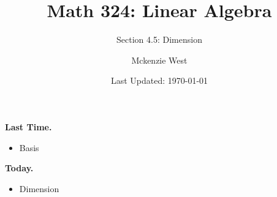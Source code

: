 \documentclass{beamer}
\theoremstyle{definition}
\begin{document}
	\title{Math 324: Linear Algebra}
	\subtitle{Section 4.5: Dimension}
	\author{Mckenzie West}
	\date{Last Updated: \today}
\begin{frame}
\maketitle
\end{frame}

\begin{frame}{\insertframenumber}
	\begin{block}{\textbf{Last Time.}}
	\begin{itemize}[label=--]
		\item Basis
	\end{itemize}
	\end{block}
	\begin{block}{\textbf{Today.}}
		\begin{itemize}[label=--]
			\item Dimension
		\end{itemize}
	\end{block}
\end{frame}
\end{document}
